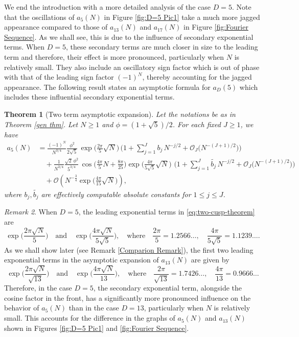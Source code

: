 \documentclass[11pt]{amsart}
\numberwithin{equation}{section}
\newtheorem{thm}{Theorem}[section]
\theoremstyle{remark}
\newtheorem{rem}[thm]{Remark}
\begin{document}
We end the introduction with a more detailed analysis of the case $D=5$. Note that the oscillations of $a_5(N)$ in Figure \ref{fig:D=5 Pic1} take a much more jagged appearance compared to those of $a_{13}(N)$ and $a_{17}(N)$ in Figure \ref{fig:Fourier Sequence}. As we shall see, this is due to the influence of secondary exponential terms. When $D=5$, these secondary terms are much closer in size to the leading term and therefore, their effect is more pronounced, particularly when $N$ is relatively small. They also include an oscillatory sign factor which is out of phase with that of the leading sign factor $(-1)^N$, thereby accounting for the jagged appearance. The following result states an asymptotic formula for $a_D(5)$ which includes these influential secondary exponential terms. 

\begin{thm}[Two term asymptotic expansion]\label{mod 5 thm}
Let the notations be as in Theorem \ref{gen thm}. Let $N \geq 1$ and $\phi = (1+\sqrt{5})/2$. For each fixed $J\ge 1$, we have 
\begin{align}\label{eq:two-cusp-theorem}
a_5(N)& =\frac{(-1)^N}{N^{3/4}} \frac{\phi^2}{2\sqrt5}\,
\exp\!\Big(\frac{2\pi}{5}\sqrt N\Big)\,
\bigg(1+\sum_{j=1}^J b_j\,N^{-j/2}+\mathcal{O}_J\big(N^{-(J+1)/2}\big)\bigg)\nonumber\\
&\quad+\frac{1}{N^{3/4}}\frac{\sqrt2\,\phi^2}{5^{3/4}}\,
\cos \Big(\frac{4\pi}{5}N+\frac{8\pi}{25}\Big) \exp \Big(\frac{4\pi}{5\sqrt5}\sqrt N\Big)\,
\,
\bigg(1+\sum_{j=1}^J \widetilde{b_j} \, N^{-j/2}+\mathcal{O}_J\big(N^{-(J+1)/2}\big)\bigg)\nonumber\\
&\quad+ \mathcal{O}\left(N^{-\frac34}\exp\!\Big(\frac{4\pi}{15}\sqrt N\Big)\right),
\end{align}
   where $b_j, \widetilde{b_j}$ are effectively computable absolute constants for $1 \leq j \leq J$. 
\end{thm}

\begin{rem}
When $D=5$, the leading exponential terms in \eqref{eq:two-cusp-theorem} are
\[
\exp\bigg( \frac{2 \pi \sqrt{N}}{5} \bigg) \quad \textrm{and} \quad  \exp\bigg( \frac{4 \pi \sqrt{N}}{5\sqrt{5}} \bigg),  \quad \textrm{where} \quad \frac{2 \pi}{5} = 1.2566\dots, \quad \frac{4 \pi}{5\sqrt{5}} =1.1239\dots.
\]
As we shall show later (see Remark \ref{Comparion Remark}), the first two leading exponential terms in the asymptotic expansion of $a_{13}(N)$ are given by
\[
\exp\bigg( \frac{2 \pi \sqrt{N}}{\sqrt{13}} \bigg) \quad \textrm{and} \quad  \exp\bigg( \frac{4 \pi \sqrt{N}}{13} \bigg),  \quad \textrm{where} \quad \frac{2 \pi}{\sqrt{13}} = 1.7426\dots, \quad \frac{4 \pi}{13} =0.9666\dots
\]
Therefore, in the case $D=5$, the secondary exponential term, alongside the cosine factor in the front, has a significantly more pronounced influence on the behavior of $a_5(N)$ than in the case $D=13$, particularly when $N$ is relatively small. This accounts for the difference in the graphs of $a_5(N)$ and $a_{13}(N)$ shown in Figures \ref{fig:D=5 Pic1} and \ref{fig:Fourier Sequence}.
\end{rem}
\end{document}
